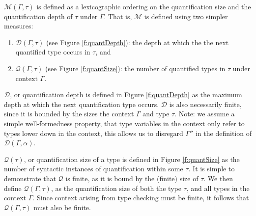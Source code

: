 \documentclass[runningheads, anon]{llncs}
\begin{document}
$\mathcal{M}(\Gamma, \tau)$ is defined as a lexicographic ordering on the quantification size and the quantification depth of $\tau$
under $\Gamma$. That is, $\mathcal{M}$ is defined using two simpler measures: 
\begin{enumerate}
\item
$\mathcal{D}(\Gamma, \tau)$ (see Figure \ref{f:quantDepth}): the depth at which the the next quantified type occurs in $\tau$, and
\item
$\mathcal{Q}(\Gamma, \tau)$ (see Figure \ref{f:quantSize}): the number of quantified types in $\tau$ under context $\Gamma$.
\end{enumerate}

$\mathcal{D}$, or quantification depth is defined in Figure \ref{f:quantDepth} as the maximum depth at which the next 
quantification type occurs. $\mathcal{D}$ is also necessarily finite, since it is bounded by the sizes the context $\Gamma$ 
and type $\tau$. Note: we assume a simple well-formedness property, that type variables in the context only refer to 
types lower down in the context, this allows us to disregard $\Gamma''$ in the definition of $\mathcal{D}(\Gamma, \alpha)$.

$\mathcal{Q}(\tau)$, or quantification size of a type is defined in Figure \ref{f:quantSize} as the number of syntactic instances of quantification 
within some $\tau$. It is simple to demonstrate that $\mathcal{Q}$ is finite, as it is bound by the (finite) size of $\tau$.
We then define $\mathcal{Q}(\Gamma, \tau)$, as 
the quantification size of both the type $\tau$, and all types in the context $\Gamma$. Since context arising from 
type checking must be finite, it follows that $\mathcal{Q}(\Gamma, \tau)$ must also be finite.
\end{document}

